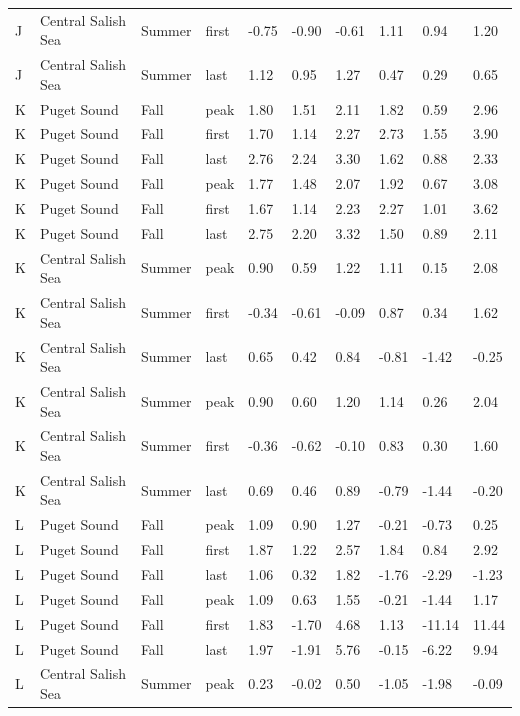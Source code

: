 \documentclass{article}
\begin{document}
\begin{table}[ht]
\begin{tabular}{|p{}|p{}|p{}|p{}|p{}p{}p{}|p{}p{}p{}|}
  J & Central Salish Sea & Summer & first & -0.75 & -0.90 & -0.61 & 1.11 & 0.94 & 1.20 \\ 
  J & Central Salish Sea & Summer & last & 1.12 & 0.95 & 1.27 & 0.47 & 0.29 & 0.65 \\ 
   \hline
K & Puget Sound & Fall & peak & 1.80 & 1.51 & 2.11 & 1.82 & 0.59 & 2.96 \\ 
  K & Puget Sound & Fall & first & 1.70 & 1.14 & 2.27 & 2.73 & 1.55 & 3.90 \\ 
  K & Puget Sound & Fall & last & 2.76 & 2.24 & 3.30 & 1.62 & 0.88 & 2.33 \\ 
  K & Puget Sound & Fall & peak & 1.77 & 1.48 & 2.07 & 1.92 & 0.67 & 3.08 \\ 
  K & Puget Sound & Fall & first & 1.67 & 1.14 & 2.23 & 2.27 & 1.01 & 3.62 \\ 
  K & Puget Sound & Fall & last & 2.75 & 2.20 & 3.32 & 1.50 & 0.89 & 2.11 \\ 
   \hline
K & Central Salish Sea & Summer & peak & 0.90 & 0.59 & 1.22 & 1.11 & 0.15 & 2.08 \\ 
  K & Central Salish Sea & Summer & first & -0.34 & -0.61 & -0.09 & 0.87 & 0.34 & 1.62 \\ 
  K & Central Salish Sea & Summer & last & 0.65 & 0.42 & 0.84 & -0.81 & -1.42 & -0.25 \\ 
  K & Central Salish Sea & Summer & peak & 0.90 & 0.60 & 1.20 & 1.14 & 0.26 & 2.04 \\ 
  K & Central Salish Sea & Summer & first & -0.36 & -0.62 & -0.10 & 0.83 & 0.30 & 1.60 \\ 
  K & Central Salish Sea & Summer & last & 0.69 & 0.46 & 0.89 & -0.79 & -1.44 & -0.20 \\ 
  L & Puget Sound & Fall & peak & 1.09 & 0.90 & 1.27 & -0.21 & -0.73 & 0.25 \\ 
  L & Puget Sound & Fall & first & 1.87 & 1.22 & 2.57 & 1.84 & 0.84 & 2.92 \\ 
  L & Puget Sound & Fall & last & 1.06 & 0.32 & 1.82 & -1.76 & -2.29 & -1.23 \\ 
  L & Puget Sound & Fall & peak & 1.09 & 0.63 & 1.55 & -0.21 & -1.44 & 1.17 \\ 
  L & Puget Sound & Fall & first & 1.83 & -1.70 & 4.68 & 1.13 & -11.14 & 11.44 \\ 
  L & Puget Sound & Fall & last & 1.97 & -1.91 & 5.76 & -0.15 & -6.22 & 9.94 \\ 
  L & Central Salish Sea & Summer & peak & 0.23 & -0.02 & 0.50 & -1.05 & -1.98 & -0.09 \\ 

\end{tabular}
\end{table}
\end{document}
